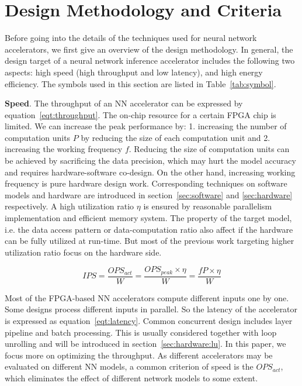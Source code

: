 \section{Design Methodology and Criteria}\label{sec:design_method}

Before going into the details of the techniques used for neural network accelerators, we first give an overview of the design methodology. In general, the design target of a neural network inference accelerator includes the following two aspects: high speed (high throughput and low latency), and high energy efficiency. The symbols used in this section are listed in Table~\ref{tab:symbol}.




\textbf{Speed}. The throughput of an NN accelerator can be expressed by equation~\ref{eqt:throughput}. The on-chip resource for a certain FPGA chip is limited. We can increase the peak performance by: 1. increasing the number of computation units $P$ by reducing the size of each computation unit and 2. increasing the working frequency $f$. Reducing the size of computation units can be achieved by sacrificing the data precision, which may hurt the model accuracy and requires hardware-software co-design. On the other hand, increasing working frequency is pure hardware design work. Corresponding techniques on software models and hardware are introduced in section~\ref{sec:software} and \ref{sec:hardware} respectively. A high utilization ratio $\eta$ is ensured by reasonable parallelism implementation and efficient memory system. The property of the target model, i.e. the data access pattern or data-computation ratio also affect if the hardware can be fully utilized at run-time. But most of the previous work targeting higher utilization ratio focus on the hardware side.

\begin{equation}\label{eqt:throughput}
    IPS = \frac{OPS_{act}}{W} = \frac{OPS_{peak} \times \eta}{W} = \frac{fP\times\eta}{W}
\end{equation}

Most of the FPGA-based NN accelerators compute different inputs one by one. Some designs process different inputs in parallel. So the latency of the accelerator is expressed as equation~\ref{eqt:latency}. Common concurrent design includes layer pipeline and batch processing. This is usually considered together with loop unrolling and will be introduced in section~\ref{sec:hardware:lu}. In this paper, we focus more on optimizing the throughput. As different accelerators may be evaluated on different NN models, a common criterion of speed is the $OPS_{act}$, which eliminates the effect of different network models to some extent.

